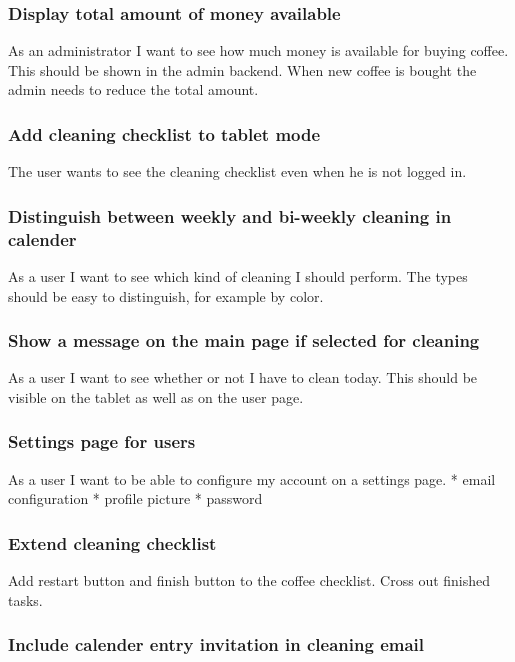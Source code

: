 \subsubsection*{Display total amount of money available}

As an administrator I want to see how much money is available for buying
coffee. This should be shown in the admin backend. When new coffee is
bought the admin needs to reduce the total amount.

\subsubsection*{Add cleaning checklist to tablet mode}

The user wants to see the cleaning checklist even when he is not logged
in.

\subsubsection*{Distinguish between weekly and bi-weekly cleaning in calender}

As a user I want to see which kind of cleaning I should perform. The
types should be easy to distinguish, for example by color.

\subsubsection*{Show a message on the main page if selected for cleaning}

As a user I want to see whether or not I have to clean today. This
should be visible on the tablet as well as on the user page.

\subsubsection*{Settings page for users}

As a user I want to be able to configure my account on a settings page.
* email configuration * profile picture * password

\subsubsection*{Extend cleaning checklist}

Add restart button and finish button to the coffee checklist. Cross out
finished tasks.

\subsubsection*{Include calender entry invitation in cleaning email}

